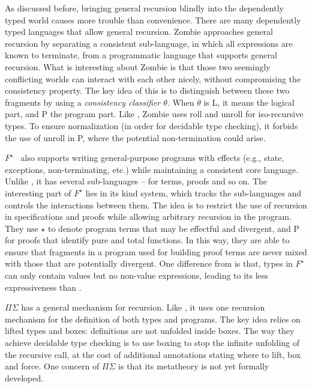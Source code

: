 As discussed before, bringing general recursion blindly into the dependently typed world causes more trouble than convenience. There are many dependently typed languages that allow general recursion. Zombie approaches general recursion by separating a consistent sub-language, in which all expressions are known to terminate, from a programmatic language that supports general recursion. What is interesting about Zombie is that those two seemingly conflicting worlds can interact with each other nicely, without compromising the consistency property. The key idea of this is to distinguish between these two fragments by using a \emph{consistency classifier $\theta$}. When $\theta$ is \textsf{L}, it means the logical part, and \textsf{P} the program part. Like \name, Zombie uses \textsf{roll} and \textsf{unroll} for iso-recursive types. To ensure normalization (in order for decidable type checking), it forbids the use of \textsf{unroll} in \textsf{P}, where the potential non-termination could arise.

$F^{\star}$~\cite{Swamy2011} also supports writing general-purpose programs with effects (e.g., state, exceptions, non-terminating, etc.) while maintaining a consistent core language. Unlike \name, it has several sub-languages -- for terms, proofs and so on. The interesting part of $F^{\star}$ lies in its kind system, which tracks the sub-languages and controls the interactions between them. The idea is to restrict the use of recursion in specifications and proofs while allowing arbitrary recursion in the program. They use $\star$ to denote program terms that may be effectful and divergent, and \textsf{P} for proofs that identify pure and total functions. In this way, they are able to ensure that fragments in a program used for building proof terms are never mixed with those that are potentially divergent. One difference from \name is that, types in $F^{\star}$ can only contain values but no non-value expressions, leading to its less expressiveness than \name.

$\Pi\Sigma$ has a general mechanism for recursion. Like \name, it uses one recursion mechanism for the definition of both types and programs. The key idea relies on lifted types and boxes: definitions are not unfolded inside boxes. The way they achieve decidable type checking is to use boxing to stop the infinite unfolding of the recursive call, at the cost of additional annotations stating where to lift, box and force. One concern of $\Pi\Sigma$ is that its metatheory is not yet formally developed.

